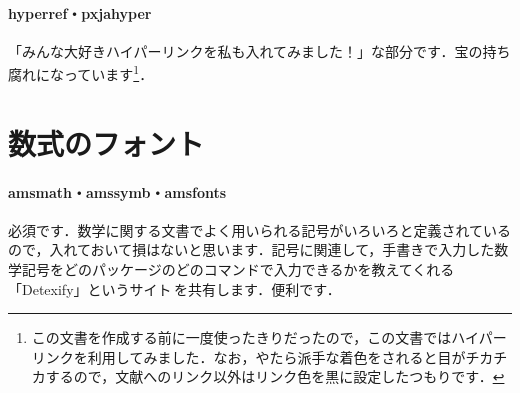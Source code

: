 \documentclass[uplatex]{jsreport}
\begin{document}
\paragraph{hyperref・pxjahyper} 「みんな大好きハイパーリンクを私も入れてみました！」な部分です．宝の持ち腐れになっています\cite{hyperref, pxjahyper}\footnote{この文書を作成する前に一度使ったきりだったので，この文書ではハイパーリンクを利用してみました．なお，やたら派手な着色をされると目がチカチカするので，文献へのリンク以外はリンク色を黒に設定したつもりです．}．

\section{数式のフォント}
\paragraph{amsmath・amssymb・amsfonts} 必須です．数学に関する文書でよく用いられる記号がいろいろと定義されているので，入れておいて損はないと思います\cite{amsmath,amsfonts}．記号に関連して，手書きで入力した数学記号をどのパッケージのどのコマンドで入力できるかを教えてくれる「Detexify」というサイト\cite{Detexify}\,を共有します．便利です．
\end{document}
